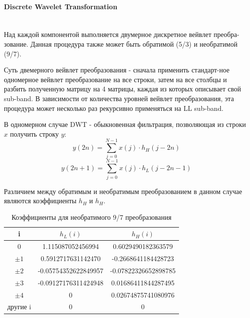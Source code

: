 \documentclass[a4paper]{article}
\begin{document}
  \paragraph{Discrete Wavelet Transformation}\mbox{}\\
  Над каждой компонентой выполняется двумерное дискретное вейвлет преобра-зование.
  Данная процедура также может быть обратимой (5/3) и необратимой (9/7).

  Суть двемерного вейвлет преобразования - сначала применить стандарт-ное
  одномерное вейвлет преобразование на все строки, затем на все столбцы
  и разбить полученную матрицу на 4 матрицы, каждая из которых описывает свой
  sub-band. В зависимости от количества уровней вейвлет преобразования,
  эта процедура может несколько раз рекурсивно применяться на LL sub-band.

  В одномерном случае DWT - обыкновенная фильтрация, позволяющая из
  строки $x$ получить строку $y$:
  \begin{equation}
    y(2n) = \sum_{j = 0}^{N - 1}x(j)\cdot{h_H(j - 2n)}
  \end{equation}
  \begin{equation}
    y(2n + 1) = \sum_{j = 0}^{N - 1}x(j)\cdot{h_L(j - 2n - 1)}
  \end{equation}

  Различием между обратимым и необратимым преобразованием в данном случае
  являются коэффициенты $h_H$ и $h_H$.

  \begin{table}[H]
    \centering
    \begin{tabular}{| c | c | c |}
      \hline
      i & $h_L(i)$ & $h_H(i)$ \\
      \hline
      0 & 1.115087052456994 & 0.6029490182363579 \\
      \hline
      $\pm 1$ &0.5912717631142470 &-0.2668641184428723 \\
      \hline
      $\pm 2$& -0.05754352622849957 &-0.07822326652898785 \\
      \hline
      $\pm 3$ &-0.09127176311424948& 0.01686411844287495 \\
      \hline
      $\pm 4$& 0 &0.02674875741080976 \\ 
      \hline
      другие i & 0 & 0 \\
      \hline
    \end{tabular}
    \caption{Коэффициенты для необратимого 9/7 преобразования}
  \end{table}
\end{document}
